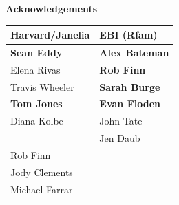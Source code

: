 \documentclass[landscape]{slides}
\begin{document}
\begin{slide}

\large
\begin{center}
\large{\textbf{Acknowledgements}} \\

\vspace{0.5in}

\normalsize
\begin{tabular}{l|l}
\textbf{Harvard/Janelia} & \textbf{EBI (Rfam)} \\ \hline
{\bf Sean Eddy}     & {\bf Alex Bateman} \\
Elena Rivas         & {\bf Rob Finn} \\
Travis Wheeler      & {\bf Sarah Burge} \\ 
{\bf Tom Jones}     & {\bf Evan Floden} \\
Diana Kolbe         & John Tate \\
                    & Jen Daub \\
Rob Finn            & \\
Jody Clements       & \\
Michael Farrar      & \\
\end{tabular}


\end{center}

\vfill
\end{slide}
\end{document}
